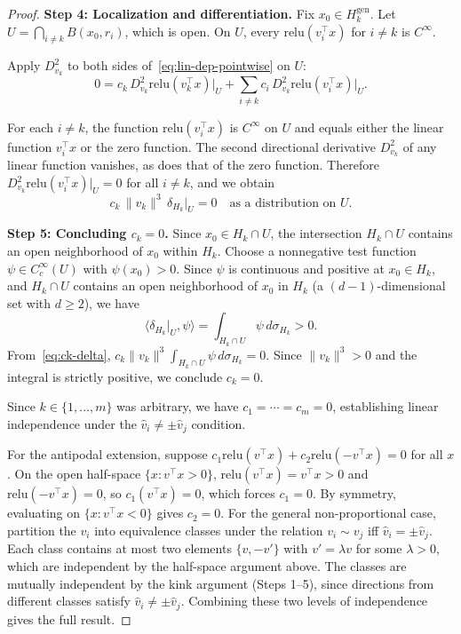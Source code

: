 \documentclass[11pt]{amsart}
\theoremstyle{definition}
\newcommand{\inner}[2]{\langle #1, #2 \rangle}
\newcommand{\norm}[1]{\| #1 \|}
\newcommand{\relu}{\mathrm{relu}}
\begin{document}
\begin{proof}
\medskip

\noindent\textbf{Step 4: Localization and differentiation.}
Fix $x_0 \in H_k^{\mathrm{gen}}$. Let $U = \bigcap_{i \neq k} B(x_0, r_i)$, which is open. On $U$, every $\relu(v_i^\top x)$ for $i \neq k$ is $C^\infty$.

Apply $D_{v_k}^2$ to both sides of~\eqref{eq:lin-dep-pointwise} on $U$:
\[
0 = c_k \, D_{v_k}^2 \relu(v_k^\top x)\big|_U + \sum_{i \neq k} c_i \, D_{v_k}^2 \relu(v_i^\top x)\big|_U.
\]

For each $i \neq k$, the function $\relu(v_i^\top x)$ is $C^\infty$ on $U$ and equals either the linear function $v_i^\top x$ or the zero function. The second directional derivative $D_{v_k}^2$ of any linear function vanishes, as does that of the zero function. Therefore $D_{v_k}^2 \relu(v_i^\top x)\big|_U = 0$ for all $i \neq k$, and we obtain
\begin{equation}\label{eq:ck-delta}
c_k \, \norm{v_k}^3 \, \delta_{H_k}\big|_U = 0 \quad \text{as a distribution on } U.
\end{equation}

\medskip

\noindent\textbf{Step 5: Concluding $c_k = 0$.}
Since $x_0 \in H_k \cap U$, the intersection $H_k \cap U$ contains an open neighborhood of $x_0$ within $H_k$. Choose a nonnegative test function $\psi \in C_c^\infty(U)$ with $\psi(x_0) > 0$. Since $\psi$ is continuous and positive at $x_0 \in H_k$, and $H_k \cap U$ contains an open neighborhood of $x_0$ in $H_k$ (a $(d{-}1)$-dimensional set with $d \geq 2$), we have
\[
\inner{\delta_{H_k}\big|_U}{\psi} = \int_{H_k \cap U} \psi \, d\sigma_{H_k} > 0.
\]
From~\eqref{eq:ck-delta}, $c_k \norm{v_k}^3 \int_{H_k \cap U} \psi \, d\sigma_{H_k} = 0$. Since $\norm{v_k}^3 > 0$ and the integral is strictly positive, we conclude $c_k = 0$.

\medskip

Since $k \in \{1, \ldots, m\}$ was arbitrary, we have $c_1 = \cdots = c_m = 0$, establishing linear independence under the $\hat{v}_i \neq \pm \hat{v}_j$ condition.

For the antipodal extension, suppose $c_1 \relu(v^\top x) + c_2 \relu(-v^\top x) = 0$ for all $x$. On the open half-space $\{x : v^\top x > 0\}$, $\relu(v^\top x) = v^\top x > 0$ and $\relu(-v^\top x) = 0$, so $c_1 (v^\top x) = 0$, which forces $c_1 = 0$. By symmetry, evaluating on $\{x : v^\top x < 0\}$ gives $c_2 = 0$. For the general non-proportional case, partition the $v_i$ into equivalence classes under the relation $v_i \sim v_j$ iff $\hat{v}_i = \pm \hat{v}_j$. Each class contains at most two elements $\{v, -v'\}$ with $v' = \lambda v$ for some $\lambda > 0$, which are independent by the half-space argument above. The classes are mutually independent by the kink argument (Steps 1--5), since directions from different classes satisfy $\hat{v}_i \neq \pm \hat{v}_j$. Combining these two levels of independence gives the full result.
\end{proof}
\end{document}
